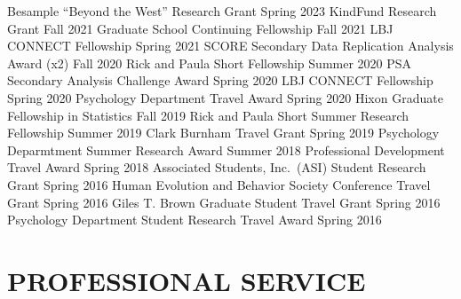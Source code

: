 \documentclass[10pt,]{article}
\begin{document}
Besample ``Beyond the West'' Research Grant
\hfill \textcolor{light-gray}{Spring 2023} \newline KindFund Research
Grant \hfill \textcolor{light-gray}{Fall 2021} \newline Graduate School
Continuing Fellowship \hfill \textcolor{light-gray}{Fall 2021} \newline
LBJ CONNECT Fellowship \hfill \textcolor{light-gray}{Spring 2021}
\newline SCORE Secondary Data Replication Analysis Award (x2)
\hfill \textcolor{light-gray}{Fall 2020} \newline Rick and Paula Short
Fellowship \hfill \textcolor{light-gray}{Summer 2020} \newline PSA
Secondary Analysis Challenge Award
\hfill \textcolor{light-gray}{Spring 2020} \newline LBJ CONNECT
Fellowship \hfill \textcolor{light-gray}{Spring 2020} \newline
Psychology Department Travel Award
\hfill \textcolor{light-gray}{Spring 2020} \newline Hixon Graduate
Fellowship in Statistics \hfill \textcolor{light-gray}{Fall 2019}
\newline Rick and Paula Short Summer Research Fellowship
\hfill \textcolor{light-gray}{Summer 2019} \newline Clark Burnham Travel
Grant \hfill \textcolor{light-gray}{Spring 2019} \newline Psychology
Deparmtment Summer Research Award
\hfill \textcolor{light-gray}{Summer 2018} \newline Professional
Development Travel Award \hfill \textcolor{light-gray}{Spring 2018}
\newline Associated Students, Inc.~(ASI) Student Research Grant
\hfill \textcolor{light-gray}{Spring 2016} \newline Human Evolution and
Behavior Society Conference Travel Grant
\hfill \textcolor{light-gray}{Spring 2016} \newline Giles T. Brown
Graduate Student Travel Grant \hfill \textcolor{light-gray}{Spring 2016}
\newline Psychology Department Student Research Travel Award
\hfill \textcolor{light-gray}{Spring 2016}

\section{PROFESSIONAL SERVICE}\label{professional-service}
\end{document}

